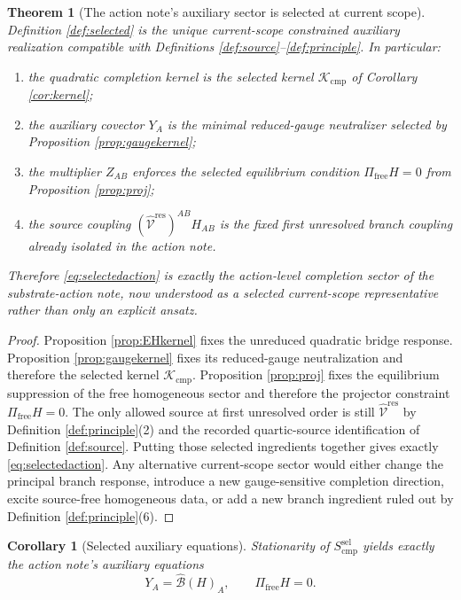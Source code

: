 \documentclass[11pt]{article}
\newcommand{\ResidualLift}{\widehat{\mathcal V}^{\mathrm{res}}}
\newcommand{\SubGaugeVec}{\widehat{\mathcal B}}
\newcommand{\FreeProj}{\Pi_{\mathrm{free}}}
\newcommand{\GaugeAux}{Y}
\newcommand{\ModeAux}{Z}
\newcommand{\CompKernel}{\mathscr K_{\mathrm{cmp}}}
\newcommand{\CompSelectAction}{S_{\mathrm{cmp}}^{\mathrm{sel}}}
\newtheorem{corollary}{Corollary}
\newtheorem{theorem}{Theorem}
\begin{document}
\begin{theorem}[The action note's auxiliary sector is selected at current scope]
\label{thm:selected}
Definition \ref{def:selected} is the unique current-scope constrained auxiliary realization compatible with Definitions \ref{def:source}--\ref{def:principle}. In particular:
\begin{enumerate}
    \item the quadratic completion kernel is the selected kernel \(\CompKernel\) of Corollary \ref{cor:kernel};
    \item the auxiliary covector \(\GaugeAux_A\) is the minimal reduced-gauge neutralizer selected by Proposition \ref{prop:gaugekernel};
    \item the multiplier \(\ModeAux_{AB}\) enforces the selected equilibrium condition \(\FreeProj H=0\) from Proposition \ref{prop:proj};
    \item the source coupling \((\ResidualLift)^{AB}H_{AB}\) is the fixed first unresolved branch coupling already isolated in the action note.
\end{enumerate}
Therefore \eqref{eq:selectedaction} is exactly the action-level completion sector of the substrate-action note, now understood as a selected current-scope representative rather than only an explicit ansatz.
\end{theorem}

\begin{proof}
Proposition \ref{prop:EHkernel} fixes the unreduced quadratic bridge response. Proposition \ref{prop:gaugekernel} fixes its reduced-gauge neutralization and therefore the selected kernel \(\CompKernel\). Proposition \ref{prop:proj} fixes the equilibrium suppression of the free homogeneous sector and therefore the projector constraint \(\FreeProj H=0\). The only allowed source at first unresolved order is still \(\ResidualLift\) by Definition \ref{def:principle}(2) and the recorded quartic-source identification of Definition \ref{def:source}. Putting those selected ingredients together gives exactly \eqref{eq:selectedaction}. Any alternative current-scope sector would either change the principal branch response, introduce a new gauge-sensitive completion direction, excite source-free homogeneous data, or add a new branch ingredient ruled out by Definition \ref{def:principle}(6).
\end{proof}

\begin{corollary}[Selected auxiliary equations]
\label{cor:selectedeqs}
Stationarity of \(\CompSelectAction\) yields exactly the action note's auxiliary equations
\begin{equation}
\GaugeAux_A=\SubGaugeVec(H)_A,
\qquad
\FreeProj H=0.
\label{eq:auxeqs}
\end{equation}
\end{corollary}
\end{document}
